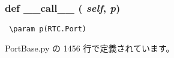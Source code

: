 \subsubsection{\setlength{\rightskip}{0pt plus 5cm}def \_\-\_\-call\_\-\_\- ( {\em self},  {\em p})}\label{classsource__py_1_1_port_base_1_1_port_base_1_1connect__func_e844e0019d38360a86bac1474132db3c}




\footnotesize\begin{verbatim}
 \param p(RTC.Port)
\end{verbatim}
\normalsize
 

 PortBase.py の 1456 行で定義されています。